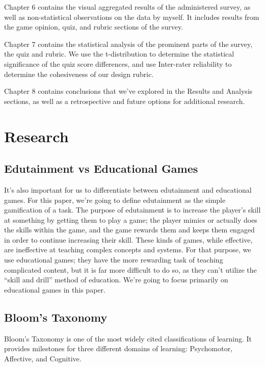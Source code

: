 \documentclass[12pt]{report}
\begin{document}
		Chapter 6 contains the visual aggregated results of the administered survey, as well as non-statistical observations on the data by myself. It includes results from the game opinion, quiz, and rubric sections of the survey.

		Chapter 7 contains the statistical analysis of the prominent parts of the survey, the quiz and rubric. We use the t-distribution to determine the statistical significance of the quiz score differences, and use Inter-rater reliability to determine the cohesiveness of our design rubric.

		Chapter 8 contains conclusions that we've explored in the Results and Analysis sections, as well as a retrospective and future options for additional research.

\chapter{Research}
	\section{Edutainment vs Educational Games}

		It's also important for us to differentiate between edutainment and educational games. For this paper, we're going to define edutainment as the simple gamification of a task. The purpose of edutainment is to increase the player's skill at something by getting them to play a game; the player mimics or actually does the skills within the game, and the game rewards them and keeps them engaged in order to continue increasing their skill. These kinds of games, while effective, are ineffective at teaching complex concepts and systems. For that purpose, we use educational games; they have the more rewarding task of teaching complicated content, but it is far more difficult to do so, as they can't utilize the “skill and drill” method of education. We're going to focus primarily on educational games in this paper.


	\section{Bloom's Taxonomy}

		Bloom's Taxonomy is one of the most widely cited classifications of learning. It provides milestones for three different domains of learning: Psychomotor, Affective, and Cognitive.
\end{document}
